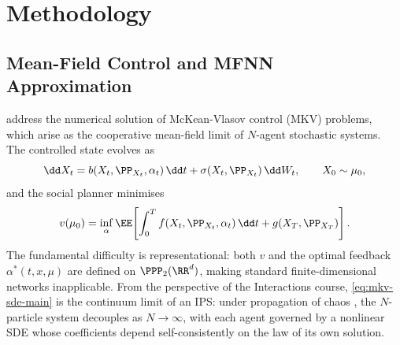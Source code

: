\documentclass[11pt]{article}
\begin{document}
\section{Methodology}

\subsection{Mean-Field Control and MFNN Approximation}

\citet{pham2024mfnn} address the numerical solution of McKean-Vlasov control (MKV) problems, which arise as the cooperative mean-field limit of $N$-agent stochastic systems. The controlled state evolves as
\begin{equation}\label{eq:mkv-sde-main}
  \dd X_t = b(X_t, \PP_{X_t}, \alpha_t)\,\dd t + \sigma(X_t, \PP_{X_t})\,\dd W_t, \qquad X_0 \sim \mu_0,
\end{equation}
and the social planner minimises
\begin{equation}\label{eq:mkv-cost-main}
  v(\mu_0) = \inf_\alpha \EE\!\left[\int_0^T f(X_t, \PP_{X_t}, \alpha_t)\,\dd t + g(X_T, \PP_{X_T})\right].
\end{equation}
The fundamental difficulty is representational: both $v$ and the optimal feedback $\alpha^*(t, x, \mu)$ are defined on $\PPP_2(\RR^d)$, making standard finite-dimensional networks inapplicable. From the perspective of the Interactions course, \eqref{eq:mkv-sde-main} is the continuum limit of an IPS: under propagation of chaos \citep{sznitman1991propagation}, the $N$-particle system decouples as $N \to \infty$, with each agent governed by a nonlinear SDE whose coefficients depend self-consistently on the law of its own solution.
\end{document}
